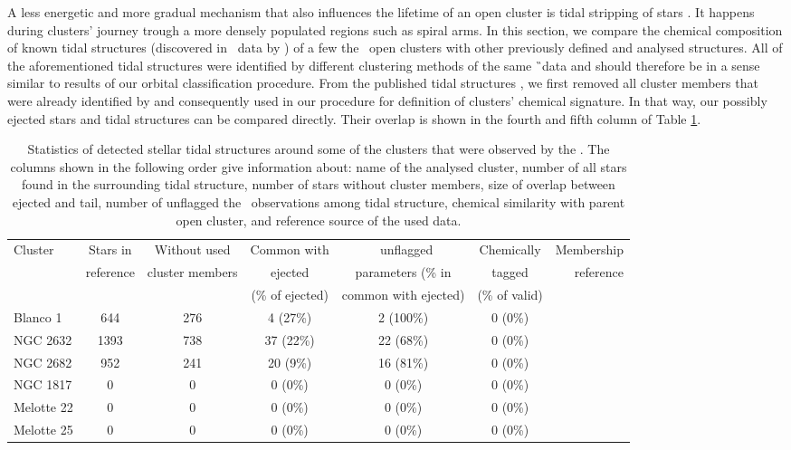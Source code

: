 A less energetic and more gradual mechanism that also influences the lifetime of an open cluster is tidal stripping of stars \cite{2006A&A...455L..17L}. It happens during clusters' journey trough a more densely populated regions such as spiral arms. In this section, we compare the chemical composition of known tidal structures (discovered in \Gs\ data by \citet{2019AA...627A...4R, 2019AA...627A.119C, 2019AA...621L...3M, 2019arXiv191206657Z}) of a few the \Gh\ open clusters with other previously defined and analysed structures. All of the aforementioned tidal structures were identified by different clustering methods of the same \G\ data and should therefore be in a sense similar to results of our orbital classification procedure. From the published tidal structures \cite{2019AA...627A...4R, 2019AA...627A.119C, 2019AA...621L...3M, 2019arXiv191206657Z}, we first removed all cluster members that were already identified by \citet{2018A&A...618A..93C} and consequently used in our procedure for definition of clusters' chemical signature. In that way, our possibly ejected stars and tidal structures can be compared directly. Their overlap is shown in the fourth and fifth column of Table \ref{tab:cluster_stats_tails}.

\begin{table}
	\centering
	\caption{Statistics of detected stellar tidal structures around some of the clusters that were observed by the \Gh. The columns shown in the following order give information about: name of the analysed cluster, number of all stars found in the surrounding tidal structure, number of stars without cluster members, size of overlap between ejected and tail, number of unflagged the \Gh\ observations among tidal structure, chemical similarity with parent open cluster, and reference source of the used data.}
	\begin{tabular}{l | c | c | c | c | c | r }
		\hline
		Cluster & Stars in & Without used & Common with & \Gh\ unflagged & Chemically & Membership\\
		& reference & cluster members & ejected & parameters (\% in & tagged & reference\\
		&  &  & (\% of ejected) & common with ejected) & (\% of valid) & \\
		\hline
		Blanco 1     & 644 & 276 & 4 (27\%) & 2 (100\%) & 0 (0\%) & \citet{2019arXiv191206657Z} \\
		NGC 2632  & 1393 & 738 & 37 (22\%) & 22 (68\%) & 0 (0\%) & \citet{2019AA...627A...4R} \\
		NGC 2682     & 952 & 241 & 20 (9\%) & 16 (81\%) & 0 (0\%) & \citet{2019AA...627A.119C} \\
		NGC 1817     & 0 & 0 & 0 (0\%) & 0 (0\%) & 0 (0\%) & \citet{a} \\
		Melotte 22   & 0 & 0 & 0 (0\%) & 0 (0\%) & 0 (0\%) & \citet{a} \\
		Melotte 25   & 0 & 0 & 0 (0\%) & 0 (0\%) & 0 (0\%) & \citet{2019AA...621L...3M} \\
		\hline
	\end{tabular}
	\label{tab:cluster_stats_tails}
\end{table}

